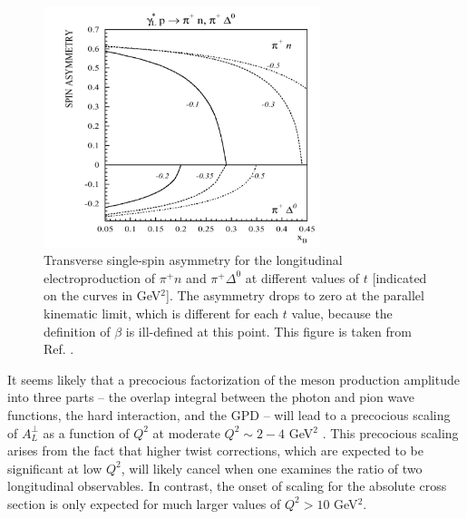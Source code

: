 \begin{figure}[hbt!]
\begin{center}
\includegraphics[height=7cm]{./figures/frankfurt_atpi.pdf}
\end{center}
\caption{\label{fig:frankfurt_atpi}
\footnotesize{
Transverse single-spin asymmetry for the longitudinal electroproduction of
$\pi^+n$ and $\pi^+\Delta^0$ at different values of $t$ [indicated on the
curves in GeV$^2$].  The asymmetry drops to zero at the parallel kinematic
limit, which is different for each $t$ value, because the definition of
$\beta$ is ill-defined at this point.  This figure is taken from
Ref. .
}}
\end{figure}

It seems likely that a precocious factorization of the meson production
amplitude into three parts -- the overlap integral between the photon and pion
wave functions, the hard interaction, and the GPD -- will lead to a precocious
scaling of $A_L^{\perp}$ as a function of $Q^2$ at moderate $Q^2\sim 2-4$
GeV$^2$ \cite{Fr99}.  This precocious scaling arises from the fact that higher
twist corrections, which are expected to be significant at low $Q^2$, will
likely cancel when one examines the ratio of two longitudinal observables.  In
contrast, the onset of scaling for the absolute cross section is only expected
for much larger values of $Q^2>10$ GeV$^2$.

